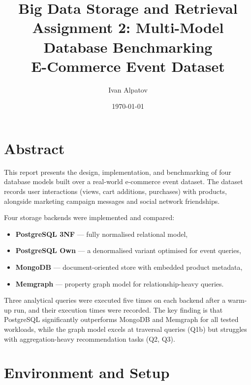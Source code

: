 \documentclass[12pt,a4paper]{article}
\title{\textbf{Big Data Storage and Retrieval}\\
       \large Assignment 2: Multi-Model Database Benchmarking\\[0.5em]
       \normalsize E-Commerce Event Dataset}
\author{Ivan Alpatov}
\date{\today}
\begin{document}
\maketitle
\tableofcontents
\newpage

\section{Abstract}

This report presents the design, implementation, and benchmarking of four database
models built over a real-world e-commerce event dataset. The dataset records
user interactions (views, cart additions, purchases) with products, alongside
marketing campaign messages and social network friendships.

Four storage backends were implemented and compared:
\begin{itemize}
  \item \textbf{PostgreSQL 3NF} --- fully normalised relational model,
  \item \textbf{PostgreSQL Own} --- a denormalised variant optimised for event queries,
  \item \textbf{MongoDB} --- document-oriented store with embedded product metadata,
  \item \textbf{Memgraph} --- property graph model for relationship-heavy queries.
\end{itemize}

Three analytical queries were executed five times on each backend after a
warm-up run, and their execution times were recorded. The key finding is that
PostgreSQL significantly outperforms MongoDB and Memgraph for all tested
workloads, while the graph model excels at traversal queries (Q1b) but
struggles with aggregation-heavy recommendation tasks (Q2, Q3).

\section{Environment and Setup}
\end{document}
